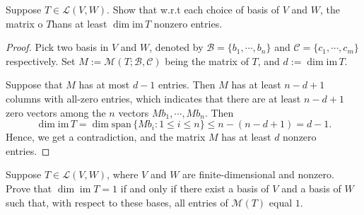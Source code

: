 \documentclass{article}
\begin{document}
\begin{problem}[3C-1]
    Suppose \( T\in \mathcal{L }(V,W) \). Show that w.r.t each choice of basis of \( V \) and \( W \), the matrix o \( T  \)hans at least \( \dim\mathrm{im}\,T  \) nonzero entries.
\end{problem}

\begin{proof}
    Pick two basis in \( V \) and \( W \), denoted by \( \mathcal{B}=\{b_1,\cdots,b_n\} \) and \( \mathcal{C}=\{c_1,\cdots,c_m\} \) respectively. Set \( M:=\mathcal{M }(T;\mathcal{B},\mathcal{C }) \) being the matrix of \( T  \), and \( d:=\dim\mathrm{im}\,T  \). \par
    Suppose that \( M  \) has at most \( d-1 \) entries. Then \( M  \) has at least \( n-d+1 \) columns with all-zero entries, which indicates that there are at least \( n-d+1 \) zero vectors among the \( n \) vectors \( Mb_1,\cdots,Mb_n \). Then 
    \[ \dim\mathrm{im}\,T=\dim\mathrm{span}\,\{Mb_i:1\le i\le n\}\le n-(n-d+1)=d-1. \] 
    Hence, we get a contradiction, and the matrix \( M  \) has at least \( d \) nonzero entries.
\end{proof}

\begin{problem}[3C-2]
    Suppose \( T\in\mathcal{L}(V,W) \), where \( V \) and \( W \) are finite-dimensional and nonzero. Prove that \( \dim\operatorname{im } T=1 \) if and only if there exist a basis of \( V \) and a basis of \( W \) such that, with respect to these bases, all entries of \( \mathcal{M}(T) \) equal \(1\).
\end{problem}
\end{document}
